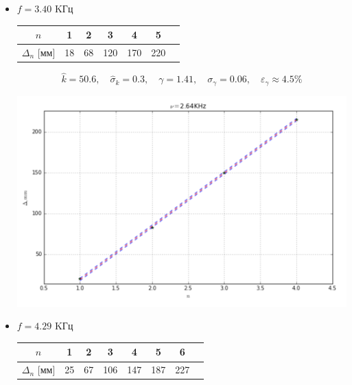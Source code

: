\documentclass[12pt]{article}
\begin{document}
\begin{enumerate}
\begin{itemize}
        \item $f = 3.40$ KГц

        \begin{center}
                    \begin{tabular}{|c|c|c|c|c|c|c|}
                            \hline 
                                $n$ & 1 & 2 & 3 & 4 & 5 \\
                            \hline
                                $\Delta_n$ [мм]& 18&68&120&170&220\\
                            \hline
                    \end{tabular}
        \end{center}

        \begin{equation}
            \hat{k} = 50.6 ,\quad \hat{\sigma}_k = 0.3, \quad \gamma = 1.41, \quad \sigma_\gamma = 0.06, \quad \varepsilon_\gamma \approx 4.5\%
        \end{equation}

        \begin{center} 
            \includegraphics[width=5in]{2ex.png}
        \end{center}

        \item $f = 4.29$ KГц

        \begin{center}
                    \begin{tabular}{|c|c|c|c|c|c|c|c|}
                            \hline 
                                $n$ & 1 & 2 & 3 & 4 & 5 & 6 \\
                            \hline
                                $\Delta_n$ [мм]& 25&67&106&147&187&227\\
                            \hline
                    \end{tabular}
        \end{center}


\end{itemize}
\end{enumerate}
\end{document}
